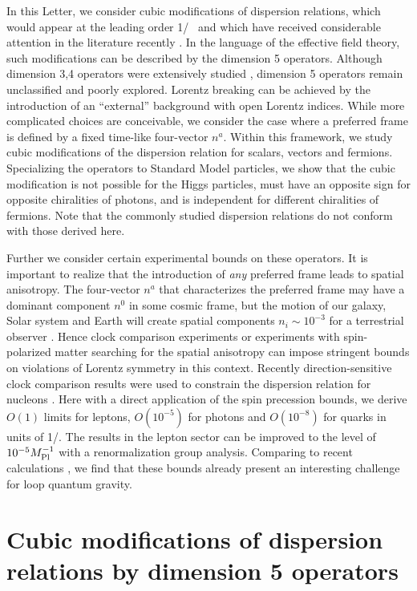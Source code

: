 In this Letter, we consider cubic modifications of dispersion
relations, which would appear at the leading order 1/\Mpl~ and
which have received considerable attention in the literature
recently \cite{mass,Jacob,wow,rot}. In the language of the
effective field theory, such modifications can be described by the
dimension 5 operators. Although dimension 3,4 operators were
extensively studied \cite{Kost}, dimension 5 operators remain
unclassified and poorly explored. Lorentz breaking can be achieved
by the introduction of an ``external'' background with open
Lorentz indices. While more complicated choices are conceivable,
we consider the case where a preferred frame is defined by a fixed
time-like four-vector $n^a$. Within this framework, we study cubic
modifications of the dispersion relation for scalars, vectors and
fermions. Specializing the operators to Standard Model particles,
we show that the cubic modification is not possible for the Higgs
particles, must have an opposite sign for opposite chiralities of
photons, and is independent for different chiralities of fermions.
Note that the commonly studied dispersion relations
\cite{mass,Jacob,wow} do not conform with those derived here.

Further we consider certain experimental bounds on these
operators. It is important to realize that the introduction of
{\em any} preferred frame leads to spatial anisotropy. The
four-vector $n^a$ that characterizes the preferred frame may have
a dominant component $n^0$ in some cosmic frame, but the motion of
our galaxy, Solar system and Earth will create spatial components
$n_i \sim 10^{-3}$ for a terrestrial observer \cite{nuCPT}. Hence
clock comparison experiments \cite{clocks} or experiments with
spin-polarized matter \cite{Heckel} searching for the  spatial
anisotropy can impose stringent bounds on violations of Lorentz
symmetry in this context. Recently direction-sensitive clock
comparison results were used to constrain the dispersion relation
for nucleons \cite{Vuc}. Here with a direct application of the
spin precession bounds, we derive $O(1)$ limits for leptons,
$O(10^{-5})$ for photons and $O(10^{-8})$ for quarks in units of
1/\Mpl. The results in the lepton sector can be improved to the
level of $10^{-5}M_{\rm {\small Pl}}^{-1}$ with a renormalization group analysis.
Comparing to recent calculations \cite{loop1,loop2,loop3}, we find
that these bounds already present an interesting challenge for
loop quantum gravity.

\section{Cubic modifications of dispersion relations by dimension
5 operators}

